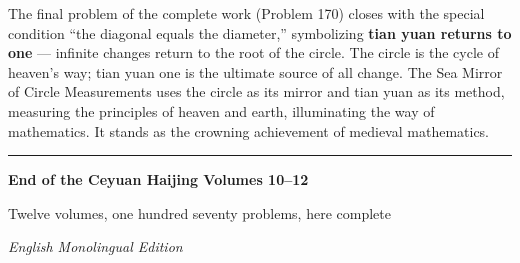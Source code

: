 \documentclass[11pt,a4paper]{book}
\newcommand{\longline}{\noindent\rule{\textwidth}{0.4pt}}
\newcommand{\cnote}[1]{\textcolor{notecolor}{\textit{#1}}}
\begin{document}
The final problem of the complete work (Problem 170) closes with the special condition ``the diagonal equals the diameter,'' symbolizing \textbf{tian yuan returns to one} --- infinite changes return to the root of the circle. The circle is the cycle of heaven's way; tian yuan one is the ultimate source of all change. The Sea Mirror of Circle Measurements uses the circle as its mirror and tian yuan as its method, measuring the principles of heaven and earth, illuminating the way of mathematics. It stands as the crowning achievement of medieval mathematics.

\vspace{1cm}
\begin{center}
\longline

\vspace{0.5cm}
{\Large\bfseries\color{titlecolor} End of the Ceyuan Haijing Volumes 10--12}

\vspace{0.3cm}
{\small Twelve volumes, one hundred seventy problems, here complete}

\vspace{0.5cm}
{\small\cnote{English Monolingual Edition}}
\end{center}
\end{document}

